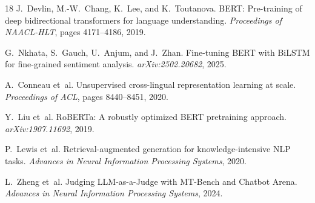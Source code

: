 \documentclass[11pt,a4paper]{article}
\begin{document}
\begin{thebibliography}{18}
J.~Devlin, M.-W.~Chang, K.~Lee, and K.~Toutanova. BERT: Pre-training of deep bidirectional transformers for language understanding. \emph{Proceedings of NAACL-HLT}, pages 4171--4186, 2019.

G.~Nkhata, S.~Gauch, U.~Anjum, and J.~Zhan. Fine-tuning BERT with BiLSTM for fine-grained sentiment analysis. \emph{arXiv:2502.20682}, 2025.

A.~Conneau et~al. Unsupervised cross-lingual representation learning at scale. \emph{Proceedings of ACL}, pages 8440--8451, 2020.

Y.~Liu et~al. RoBERTa: A robustly optimized BERT pretraining approach. \emph{arXiv:1907.11692}, 2019.

P.~Lewis et~al. Retrieval-augmented generation for knowledge-intensive NLP tasks. \emph{Advances in Neural Information Processing Systems}, 2020.

L.~Zheng et~al. Judging LLM-as-a-Judge with MT-Bench and Chatbot Arena. \emph{Advances in Neural Information Processing Systems}, 2024.

\end{thebibliography}
\end{document}

